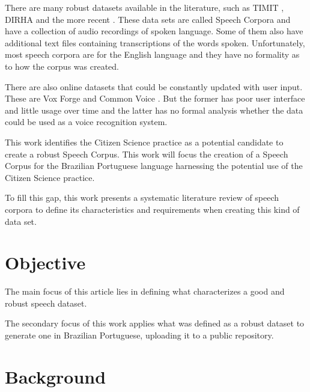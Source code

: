 

There are many robust datasets available in the literature, such as TIMIT \cite{Lamel1992timmit}, DIRHA \cite{Ravanelli2016dirha} and the more recent \cite{chanchaochai2018globaltimit}. These data sets are called Speech Corpora and have a collection of audio recordings of spoken language. Some of them also have additional text files containing transcriptions of the words spoken.
Unfortunately, most speech corpora are for the English language \cite{LeRouxVincent2014TRdatasets} and they have no formality as to how the corpus was created.

There are also online datasets that could be constantly updated with user input. These are Vox Forge \cite{asd} and Common Voice \cite{mozilla}. But the former has poor user interface and little usage over time and the latter has no formal analysis whether the data could be used as a voice recognition system.

This work identifies the Citizen Science practice as a potential candidate to create a robust Speech Corpus.
This work will focus the creation of a Speech Corpus for the Brazilian Portuguese language harnessing the potential use of the Citizen Science practice.

To fill this gap, this work presents a systematic literature review of speech corpora to define its characteristics and requirements when creating this kind of data set.

\chapter{Objective}

The main focus of this article lies in defining what characterizes a good and robust speech dataset.

The secondary focus of this work applies what was defined as a robust dataset to generate one in Brazilian Portuguese, uploading it to a public repository. 

\chapter{Background}

